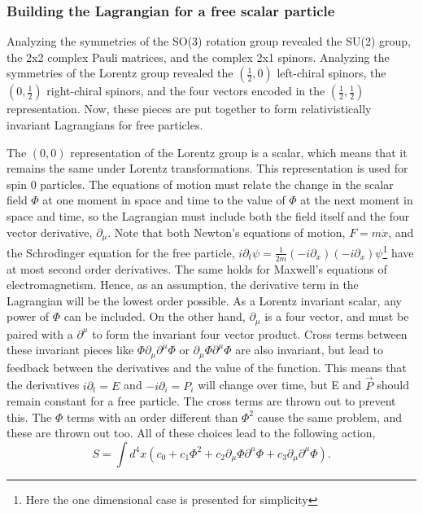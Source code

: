 \documentclass[12pt]{article}
\begin{document}
\subsubsection{Building the Lagrangian for a free scalar particle}

Analyzing the symmetries of the SO(3) rotation group revealed the SU(2) group, the 2x2 complex Pauli matrices, and the complex 2x1 spinors. Analyzing the symmetries of the Lorentz group revealed the $(\frac{1}{2}, 0)$ left-chiral spinors, the $(0, \frac{1}{2})$ right-chiral spinors, and the four vectors encoded in the $(\frac{1}{2}, \frac{1}{2})$ representation. Now, these pieces are put together to form relativistically invariant Lagrangians for free particles.  

The $(0,0)$ representation of the Lorentz group is a scalar, which means that it remains the same under Lorentz transformations. This representation is used for spin 0 particles. The equations of motion must relate the change in the scalar field $\Phi$ at one moment in space and time to the value of $\Phi$ at the next moment in space and time, so the Lagrangian must include both the field itself and the four vector derivative, $\partial_\mu$. Note that both Newton's equations of motion, $F=m\ddot{x}$, and the Schrodinger equation for the free particle, $i\partial_t\psi = \frac{1}{2m}(-i\partial_x)(-i\partial_x)\psi$\footnote{Here the one dimensional case is presented for simplicity} have at most second order derivatives. The same holds for Maxwell's equations of electromagnetism. Hence, as an assumption, the derivative term in the Lagrangian will be the lowest order possible. As a Lorentz invariant scalar, any power of $\Phi$ can be included. On the other hand, $\partial_\mu$ is a four vector, and must be paired with a $\partial^\mu$ to form the invariant four vector product. Cross terms between these invariant pieces like $\Phi\partial_\mu\partial^\mu\Phi$ or $\partial_\mu\Phi\partial^\mu\Phi$ are also invariant, but lead to feedback between the derivatives and the value of the function. This means that the derivatives $i\partial_t = E$ and $-i\partial_i = P_i$ will change over time, but E and $\vec{P}$ should remain constant for a free particle. The cross terms are thrown out to prevent this. The $\Phi$ terms with an order different than $\Phi^2$ cause the same problem, and these are thrown out too. All of these choices lead to the following action, 
\begin{equation}
S = \int d^4x \left(c_0 + c_1 \Phi^2  
+ c_2 \partial_\mu\Phi\partial^\mu\Phi + c_3 \partial_\mu \partial^\mu \Phi\right).
\end{equation}
\end{document}
